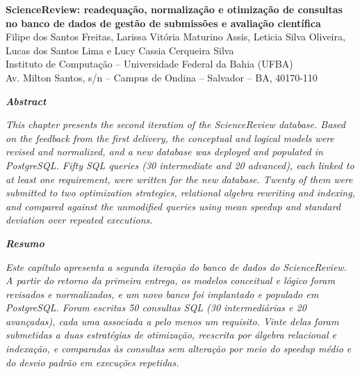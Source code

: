 \documentclass[12pt,a4paper]{article}
\begin{document}
\thispagestyle{empty}

\begin{flushleft}
{\fontsize{20}{24}\selectfont\bfseries ScienceReview: readequação, normalização e otimização de consultas no banco de dados de gestão de submissões e avaliação científica}\\[1cm]
{\large Filipe dos Santos Freitas, Larissa Vitória Maturino Assis, Leticia Silva Oliveira, Lucas dos Santos Lima e Lucy Cassia Cerqueira Silva}\\[4pt]
{\normalsize Instituto de Computação -- Universidade Federal da Bahia (UFBA)\\
Av. Milton Santos, s/n -- Campus de Ondina -- Salvador -- BA, 40170-110}
\end{flushleft}

\vspace{1cm}

\begin{center}\textbf{\textit{Abstract}}\end{center}
\vspace{-6pt}
{\leftskip=0.8cm\rightskip=0.8cm\noindent\itshape
This chapter presents the second iteration of the ScienceReview database. Based on
the feedback from the first delivery, the conceptual and logical models were revised
and normalized, and a new database was deployed and populated in PostgreSQL. Fifty
SQL queries (30 intermediate and 20 advanced), each linked to at least one
requirement, were written for the new database. Twenty of them were submitted to two
optimization strategies, relational algebra rewriting and indexing, and compared
against the unmodified queries using mean speedup and standard deviation over
repeated executions.\par}

\begin{center}\textbf{\textit{Resumo}}\end{center}
\vspace{-6pt}
{\leftskip=0.8cm\rightskip=0.8cm\noindent\itshape
Este capítulo apresenta a segunda iteração do banco de dados do ScienceReview. A
partir do retorno da primeira entrega, os modelos conceitual e lógico foram
revisados e normalizados, e um novo banco foi implantado e populado em PostgreSQL.
Foram escritas 50 consultas SQL (30 intermediárias e 20 avançadas), cada uma
associada a pelo menos um requisito. Vinte delas foram submetidas a duas estratégias
de otimização, reescrita por álgebra relacional e indexação, e comparadas às
consultas sem alteração por meio do \textit{speedup} médio e do desvio padrão em
execuções repetidas.\par}
\end{document}
